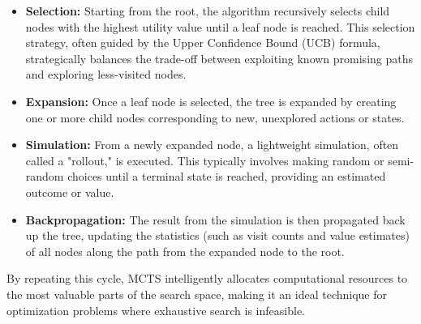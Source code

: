 \begin{itemize}
    \item \textbf{Selection:} Starting from the root, the algorithm recursively selects child nodes with the highest utility value until a leaf node is reached. This selection strategy, often guided by the Upper Confidence Bound (UCB) formula, strategically balances the trade-off between exploiting known promising paths and exploring less-visited nodes.
    \item \textbf{Expansion:} Once a leaf node is selected, the tree is expanded by creating one or more child nodes corresponding to new, unexplored actions or states.
    \item \textbf{Simulation:} From a newly expanded node, a lightweight simulation, often called a "rollout," is executed. This typically involves making random or semi-random choices until a terminal state is reached, providing an estimated outcome or value.
    \item \textbf{Backpropagation:} The result from the simulation is then propagated back up the tree, updating the statistics (such as visit counts and value estimates) of all nodes along the path from the expanded node to the root.
\end{itemize}

By repeating this cycle, MCTS intelligently allocates computational resources to the most valuable parts of the search space, making it an ideal technique for optimization problems where exhaustive search is infeasible.